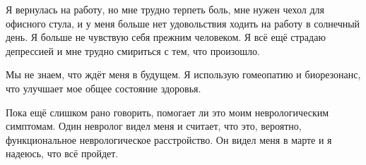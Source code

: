 Я вернулась на работу, но мне трудно терпеть боль, мне нужен чехол для офисного
стула, и у меня больше нет удовольствия ходить на работу в солнечный день. Я
больше не чувствую себя прежним человеком. Я всё ещё страдаю депрессией и мне
трудно смириться с тем, что произошло.

Мы не знаем, что ждёт меня в будущем. Я использую гомеопатию и биорезонанс, что
улучшает мое общее состояние здоровья.

Пока ещё слишком рано говорить, помогает ли это моим неврологическим
симптомам. Один невролог видел меня и считает, что это, вероятно, функциональное
неврологическое расстройство. Он видел меня в марте и я надеюсь, что всё
пройдет.
